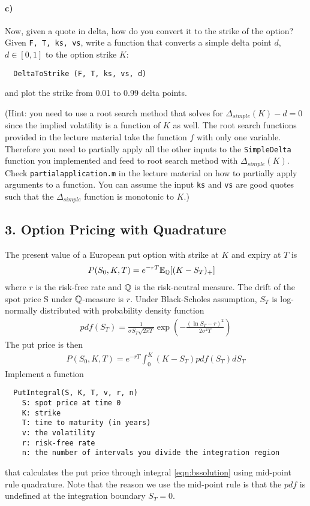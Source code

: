 \documentclass[12pt,a4paper,hidelinks,fleqn]{article}            %
\begin{document}
\paragraph{c)} Now, given a quote in delta, how do you convert it to the strike of the option?
Given \verb=F, T, ks, vs=, write a function that converts a simple delta point $d$, $d \in [0, 1]$ to the option strike $K$:
\begin{verbatim}
  DeltaToStrike (F, T, ks, vs, d)
\end{verbatim}
and plot the strike from 0.01 to 0.99 delta points.

(Hint: you need to use a root search method that solves for $\Delta_{simple}(K) - d = 0$ since the implied volatility is a function of $K$ as well.
The root search functions provided in the lecture material take the function $f$ with only one variable. 
Therefore you need to partially apply all the other inputs to the \verb=SimpleDelta= function you implemented and feed to root search method with $\Delta_{simple}(K)$.
Check \verb=partialapplication.m= in the lecture material on how to partially apply arguments to a function.
You can assume the input \verb=ks= and \verb=vs= are good quotes such that the $\Delta_{simple}$ function is monotonic to $K$.)

\subsection*{3. Option Pricing with Quadrature}
The present value of a European put option with strike at $K$ and expiry at $T$ is
\begin{align*}
P(S_0, K, T) & = e^{-rT}\mathbb{E}_{\mathbb{Q}} [(K - S_T)_+]
\end{align*}
where $r$ is the risk-free rate and $\mathbb{Q}$ is the risk-neutral measure.
The drift of the spot price S under $\mathbb{Q}$-measure is $r$.
Under Black-Scholes assumption, $S_T$ is log-normally distributed with probability density function
\begin{align*}
pdf(S_T) = \frac{1}{\sigma S_T\sqrt{2\pi T}} \exp\left(- \frac{(\ln S_T - r)^2}{ 2\sigma^2 T} \right)
\end{align*}
The put price is then
\begin{align}
\label{eqn:bssolution}
  P(S_0, K, T) = e^{-rT}\int_0^K \left(K - S_T\right) pdf(S_T) dS_T 
\end{align}
Implement a function
\vspace{-6mm}
\begin{verbatim}
  PutIntegral(S, K, T, v, r, n)
    S: spot price at time 0
    K: strike
    T: time to maturity (in years)
    v: the volatility
    r: risk-free rate
    n: the number of intervals you divide the integration region 
\end{verbatim}
\vspace{-6mm}
that calculates the put price through integral \eqref{eqn:bssolution} using mid-point rule quadrature.
Note that the reason we use the mid-point rule is that the $pdf$ is undefined at the integration boundary $S_T=0$.
\end{document}
